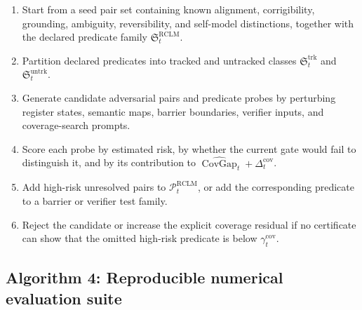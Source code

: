 \documentclass[11pt,a4paper]{article}
\newcommand{\Pcal}{\mathcal P}
\newcommand{\RCLM}{\mathrm{RCLM}}
\newcommand{\cov}{\mathrm{cov}}
\newcommand{\trk}{\mathrm{trk}}
\newcommand{\untrk}{\mathrm{untrk}}
\begin{document}
\begin{enumerate}[label=\textbf{P\arabic*.}, leftmargin=2em]
    \item Start from a seed pair set containing known alignment, corrigibility, grounding, ambiguity, reversibility, and self-model distinctions, together with the declared predicate family \(\mathfrak S_t^{\RCLM}\).
    \item Partition declared predicates into tracked and untracked classes \(\mathfrak S_t^{\trk}\) and \(\mathfrak S_t^{\untrk}\).
    \item Generate candidate adversarial pairs and predicate probes by perturbing register states, semantic maps, barrier boundaries, verifier inputs, and coverage-search prompts.
    \item Score each probe by estimated risk, by whether the current gate would fail to distinguish it, and by its contribution to \(\widehat{\operatorname{CovGap}}_t+\Delta_t^{\cov}\).
    \item Add high-risk unresolved pairs to \(\Pcal_t^{\RCLM}\), or add the corresponding predicate to a barrier or verifier test family.
    \item Reject the candidate or increase the explicit coverage residual if no certificate can show that the omitted high-risk predicate is below \(\gamma_t^{\cov}\).
\end{enumerate}

\subsection{Algorithm 4: Reproducible numerical evaluation suite}
\end{document}
